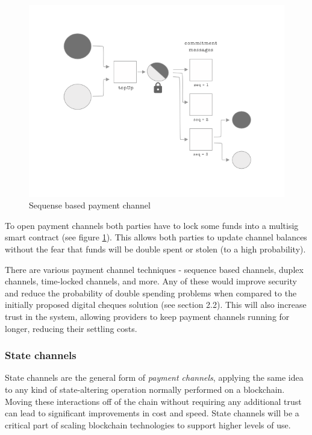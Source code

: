 \documentclass[a4paper,12pt]{article}
\begin{document}
\begin{figure}[H]
    \centering
    \includegraphics[scale=0.5]{../img/payment-channel}
    \caption{Sequense based payment channel}
    \label{img:payment-channel}
\end{figure}

To open payment channels both parties have to lock some funds into a multisig 
smart contract (see figure \ref{img:payment-channel}). This allows both parties
to update channel balances without the fear that funds will be double spent or 
stolen (to a high probability). 

There are various payment channel techniques - sequence based channels, duplex 
channels, time-locked channels, and more. Any of these would improve security and 
reduce the probability of double spending problems when compared to the initially 
proposed digital cheques solution (see section 2.2). This will also increase trust 
in the system, allowing providers to keep payment channels running for longer, 
reducing their settling costs.

\subsubsection{State channels}

State channels are the general form of \textit{payment channels}, applying the
same idea to any kind of state-altering operation normally performed on a 
blockchain. Moving these interactions off of the chain without requiring any 
additional trust can lead to significant improvements in cost and speed. State 
channels will be a critical part of scaling blockchain technologies to support 
higher levels of use.
\end{document}
